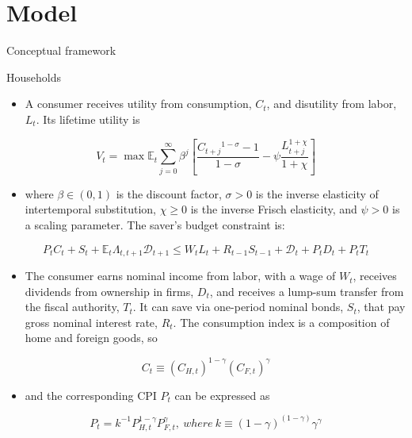 \documentclass[10pt]{beamer}
\begin{document}
\begin{frame}{}
    
\end{frame}


\section{Model}

\begin{frame}{Conceptual framework}
    
\end{frame}

\begin{frame}{Households}
\fontsize{8}{8}\selectfont

\begin{itemize}
    \item A consumer receives utility from consumption, $C_{t}$, and disutility from labor, $L_{t}$. Its lifetime utility is
\end{itemize}


$$
V_{t}=\max \mathbb{E}_{t} \sum_{j=0}^{\infty} \beta^{j}\left[\frac{C_{t+j}{ }^{1-\sigma}-1}{1-\sigma}-\psi \frac{L_{t+j}^{1+\chi}}{1+\chi}\right]
$$

\begin{itemize}
    \item where $\beta \in(0,1)$ is the discount factor, $\sigma>0$ is the inverse elasticity of intertemporal substitution, $\chi \geq 0$ is the inverse Frisch elasticity, and $\psi>0$ is a scaling parameter. The saver's budget constraint is:
\end{itemize}


$$
P_{t} C_{t}+S_{t}+\mathbb{E}_{t} \Lambda_{t, t+1} \mathcal{D}_{t+1} \leq W_{t} L_{t}+R_{t-1} S_{t-1}+\mathcal{D}_{t}+P_{t} D_{t}+P_{t} T_{t}
$$



\begin{itemize}
    \item The consumer earns nominal income from labor, with a wage of $W_{t}$, receives dividends from ownership in firms, $D_{t}$, and receives a lump-sum transfer from the fiscal authority, $T_{t}$. It can save via one-period nominal bonds, $S_{t}$, that pay gross nominal interest rate, $R_{t}$. The consumption index is a composition of home and foreign goods, so
\end{itemize}



$$
C_{t}\equiv\left(C_{H, t}\right)^{1-\gamma}\left(C_{F, t}\right)^{\gamma}
$$

\begin{itemize}
    \item and the corresponding CPI $P_{t}$ can be expressed as
\end{itemize}

$$
P_{t}=k^{-1} P_{H, t}^{1-\gamma} P_{F, t}^{\gamma}, \ where \ k \equiv(1-\gamma)^{(1-\gamma)} \gamma^{\gamma}
$$

\end{frame}
\end{document}
